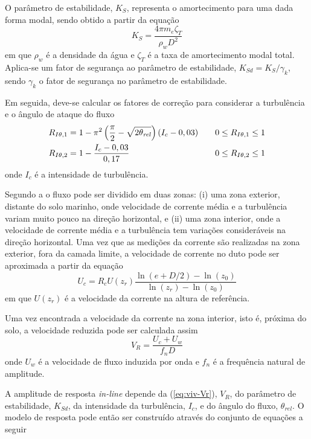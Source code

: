 O parâmetro de estabilidade, $K_S$, representa o amortecimento para uma dada forma modal, sendo obtido a partir da equação
\begin{equation}
\label{eq:viv-Ks}
K_S = \frac{4 \pi m_e \zeta_T}{\rho_w D^2}
\end{equation}
em que $\rho_w$ é a densidade da água e $\zeta_T$ é a taxa de amortecimento modal total.
Aplica-se um fator de segurança ao parâmetro de estabilidade, $K_\mathit{Sd} = K_S/\gamma_k$, sendo $\gamma_k$ o fator de segurança no parâmetro de estabilidade.

Em seguida, deve-se calcular os fatores de correção para considerar a turbulência e o ângulo de ataque do fluxo
\begin{equation}
\label{eq:viv-Riot}
\begin{aligned}
	R_{I\theta,1} &= 1 - \pi^2\left(\frac{\pi}{2} - \sqrt{2 \theta_\mathit{rel}}\right)(I_c - 0,03) & \quad \mbox 0 \leq R_{I\theta,1} \leq 1\\
    R_{I\theta,2} &= 1 - \frac{I_c - 0,03}{0,17}                                                    & \quad \mbox  0 \leq R_{I\theta,2} \leq 1
\end{aligned}
\end{equation}
onde $I_c$ é a intensidade de turbulência.

Segundo a  o fluxo pode ser dividido em duas zonas: (i) uma zona exterior, distante do solo marinho, onde velocidade de corrente média e a turbulência variam muito pouco na direção horizontal, e (ii) uma zona interior, onde a velocidade de corrente média e a turbulência tem variações consideráveis na direção horizontal. Uma vez que as medições da corrente são realizadas na zona exterior, fora da camada limite, a velocidade de corrente no duto pode ser aproximada a partir da equação
\begin{equation}
\label{eq:vel-corrente}
U_c = R_c U(z_r) \frac{\ln{(e+D/2)} - \ln(z_0)}{\ln (z_r)- \ln (z_0)}
\end{equation}
em que $U(z_r)$ é a velocidade da corrente na altura de referência.

Uma vez encontrada a velocidade da corrente na zona interior, isto é, próxima do solo, a velocidade reduzida pode ser calculada assim
\begin{equation}
\label{eq:viv-Vr}
V_R = \frac{U_c + U_w}{f_n D}
\end{equation}
onde $U_w$ é a velocidade de fluxo induzida por onda e $f_n$ é a frequência natural de amplitude.

A amplitude de resposta \textit{in-line} depende da  (\autoref{eq:viv-Vr}), $V_R$, do parâmetro de estabilidade, $K_\mathit{Sd}$, da intensidade da turbulência, $\mathit{I}_c$, e do ângulo do fluxo, $\theta_\mathit{rel}$.
O modelo de resposta pode então ser construído através do conjunto de equações a seguir

